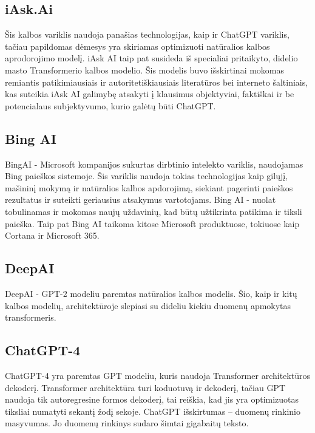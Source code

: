 \documentclass[conference]{IEEEtran}
\begin{document}
\subsection{iAsk.Ai}
Šis kalbos variklis naudoja panašias technologijas, kaip ir ChatGPT variklis, tačiau
papildomas dėmesys yra skiriamas optimizuoti natūralios kalbos aprodorojimo modelį. iAsk AI taip pat susideda iš specialiai pritaikyto,
didelio masto Transformerio kalbos modelio. Šis modelis buvo išskirtinai mokomas remiantis
patikimiausiais ir autoritetiškiausiais literatūros bei interneto šaltiniais,
kas suteikia iAsk AI galimybę atsakyti į klausimus objektyviai,
faktiškai ir be potencialaus subjektyvumo, kurio galėtų būti ChatGPT.

\subsection{Bing AI}
BingAI - Microsoft kompanijos sukurtas dirbtinio intelekto variklis, naudojamas Bing paieškos sistemoje. Šis variklis naudoja tokias technologijas kaip gilųjį, mašininį mokymą ir natūralios kalbos apdorojimą, siekiant pagerinti paieškos rezultatus ir suteikti geriausius atsakymus vartotojams. Bing AI - nuolat tobulinamas ir mokomas naujų uždavinių, kad būtų užtikrinta patikima ir tiksli paieška. Taip pat Bing AI taikoma kitose Microsoft produktuose, tokiuose kaip Cortana ir Microsoft 365.

\subsection{DeepAI}
DeepAI - GPT-2 modeliu paremtas natūralios kalbos modelis. Šio, kaip ir kitų kalbos modelių, architektūroje slepiasi su dideliu kiekiu duomenų apmokytas transformeris.

\subsection{ChatGPT-4}
ChatGPT-4 yra paremtas GPT modeliu, kuris naudoja Transformer architektūros dekoderį. Transformer architektūra turi koduotuvą ir dekoderį, tačiau GPT naudoja tik autoregresine formos dekoderį, tai reiškia, kad jis yra optimizuotas tiksliai numatyti sekantį žodį sekoje. ChatGPT išskirtumas – duomenų rinkinio masyvumas. Jo duomenų rinkinys sudaro šimtai gigabaitų teksto.
\end{document}
